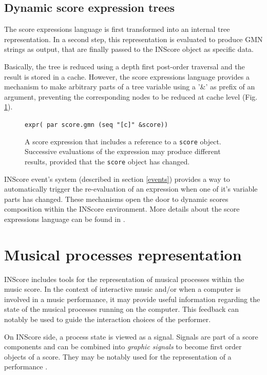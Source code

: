 \documentclass[11pt,a4paper]{article}
\newcommand{\OSC}[1]	{{\fontsize{10pt}{10pt} \selectfont\texttt{#1}}}
\newcommand{\sample}[1]	{\vspace{-0.2em}\begin{center}\colorbox{mygrey}{\begin{minipage}[t]{0.98\columnwidth} {\small \texttt{#1}}\end{minipage}}\end{center}}
\begin{document}
\subsection{Dynamic score expression trees}

The score expressions language is first transformed into an internal tree representation. In a second step, this representation is evaluated to produce GMN strings as output, that are finally passed to the INScore object as specific data. 

Basically, the tree is reduced using a depth first post-order traversal and the result is stored in a cache. However, the score expressions language provides a mechanism to make arbitrary parts of a tree variable using a '\&' as prefix of an argument, preventing the corresponding nodes to be reduced at cache level (Fig. \ref{fig:scex2}). 
    
\begin{figure}[ht]
\begin{center}
\sample{expr( par score.gmn (seq "[c]" \&score))
}
\caption{A score expression that includes a reference to a \OSC{score} object. Successive evaluations of the expression may produce different results, provided that the \OSC{score} object has changed.}
\label{fig:scex2}
\end{center}
\end{figure}

INScore event's system (described in section \ref{events}) provides a way to automatically trigger the re-evaluation of an expression when one  of it's variable parts has changed. These mechanisms open the door to dynamic scores composition within the INScore environment.
More details about the score expressions language can be found in \cite{Lepetit-Aimon_tenor2016}.


\section{Musical processes representation}

INScore includes tools for the representation of musical processes within the music score. In the context of interactive music and/or when a computer is involved in a music performance, it may provide useful information regarding the state of the musical processes running on the computer. This feedback can notably be used to guide the interaction choices of the performer.

On INScore side, a process state is viewed as a signal. Signals are part of a score components and can be combined into \emph{graphic signals} to become first order objects of a score. They may be notably used for the representation of a performance \cite{Fober:12a}. 
\end{document}
